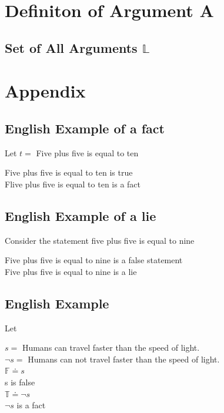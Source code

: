 \documentclass[11pt]{article}
\begin{document}
\section{Definiton of Argument A}
\subsection{Set of All Arguments $\mathbb{L}$}











\newpage
\section*{Appendix}


\subsection{English Example of a fact}
Let $t=$ Five plus five is equal to ten
\begin{center}
Five plus five is equal to ten is true\\ \vspace{2mm}
Flive plus five is equal to ten is a fact
\end{center}



\subsection{English Example of a lie}
Consider the statement five plus five is equal to nine
\begin{center}
Five plus five is equal to nine is a false statement\\ \vspace{2mm}
Five plus five is equal to nine is a lie
\end{center}


\subsection{English Example}
Let
\begin{center}
$s=$ Humans can travel faster than the speed of light.\\ \vspace{2mm}
$\lnot s=$ Humans can not travel faster than the speed of light.\\ \vspace{2mm}
$\mathbb{F} \doteq s$\\
s is false\\ \vspace{2mm}
$\mathbb{T} \doteq \lnot s$\\
$\lnot s$ is a fact
\end{center}
\end{document}
